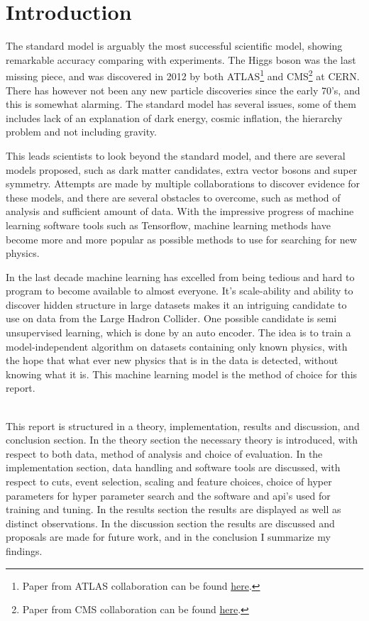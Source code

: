 \documentclass[ reprint, amsmath,amssymb, aps, nofootinbib]{revtex4-2}
\begin{document}
\section{Introduction}
The standard model is arguably the most successful scientific model, showing remarkable accuracy comparing with experiments.
The Higgs boson was the last missing piece, and was discovered in 2012 by both ATLAS\footnote{Paper from ATLAS collaboration can be found \href{https://arxiv.org/abs/1207.7214}{here}.} and CMS\footnote{Paper from CMS collaboration can be found \href{https://arxiv.org/abs/1207.7235}{here}.} at CERN. There has however not been any new particle discoveries since the early 70's, and this is somewhat alarming. The standard model has several issues, some of them includes lack of an explanation of dark energy, cosmic inflation, the hierarchy problem and not including gravity. \par 
This leads scientists to look beyond the standard model, and there are several models proposed, such as dark matter candidates, extra vector bosons and super symmetry. Attempts are made by multiple collaborations to discover evidence for these models, and there are several obstacles to overcome, such as method of analysis and sufficient amount of data. With the impressive progress of machine learning software tools such as Tensorflow\cite{tensorflow2015-whitepaper}, machine learning methods have become more and more popular as possible methods  to use for searching for new physics. \par 
In the last decade machine learning has excelled from being tedious and hard to program to become available to almost everyone. It's scale-ability and ability to discover hidden structure in large datasets makes it an intriguing candidate to use on data from the Large Hadron Collider. One possible candidate is semi unsupervised learning, which is done by an auto encoder. The idea is to train a model-independent algorithm on datasets containing only known physics, with the hope that what ever new physics that is in the data is detected, without knowing what it is.  This machine learning model is the method of choice for this report. \par
\\
This report is structured in a theory, implementation, results and discussion, and conclusion section. In the theory section the necessary theory is introduced, with respect to both data, method of analysis and choice of evaluation. In the implementation section, data handling and software tools are discussed, with respect to cuts, event selection, scaling and feature choices, choice of hyper parameters for hyper parameter search and the software and api's used for training and tuning. In the results section the results are displayed as well as distinct observations. In the discussion section the results are discussed and proposals are made for future work, and in the conclusion I summarize my findings. 
\end{document}
